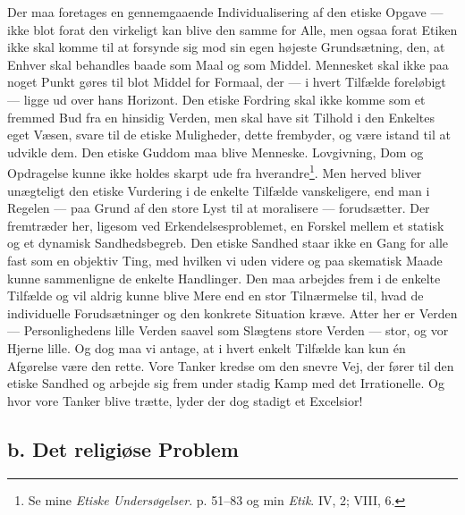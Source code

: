 \documentclass[12pt,a4paper]{book}
\newcommand{\apage}[1]{\marginnote{\footnotesize\textit{[#1]}}}
\begin{document}
Der maa foretages en gennemgaaende Individualisering af den etiske Opgave --- ikke blot
forat den virkeligt kan blive den samme for Alle, men ogsaa forat Etiken ikke skal komme
til at forsynde sig mod sin egen højeste Grundsætning, den, at Enhver skal behandles baade
som Maal \apage{369} og som Middel. Mennesket skal ikke paa noget Punkt gøres til blot Middel for
Formaal, der --- i hvert Tilfælde foreløbigt --- ligge ud over hans Horizont. Den etiske
Fordring skal ikke komme som et fremmed Bud fra en hinsidig Verden, men skal have sit
Tilhold i den Enkeltes eget Væsen, svare til de etiske Muligheder, dette frembyder, og være
istand til at udvikle dem. Den etiske Guddom maa blive Menneske. Lovgivning, Dom og
Opdragelse kunne ikke holdes skarpt ude fra hverandre\footnote{Se mine \emph{Etiske
Undersøgelser}. p. 51--83 og min \emph{Etik}. IV, 2; VIII, 6.}. Men herved bliver
unægteligt den etiske Vurdering i de enkelte Tilfælde vanskeligere, end man i Regelen --- paa
Grund af den store Lyst til at moralisere --- forudsætter. Der fremtræder her, ligesom ved
Erkendelsesproblemet, en Forskel mellem et statisk og et dynamisk Sandhedsbegreb. Den etiske
Sandhed staar ikke en Gang for alle fast som en objektiv Ting, med hvilken vi uden videre
og paa skematisk Maade kunne sammenligne de enkelte Handlinger. Den maa arbejdes frem i de enkelte Tilfælde og vil aldrig kunne blive Mere end en stor Tilnærmelse til, hvad de
individuelle Forudsætninger og den konkrete Situation kræve. Atter her er Verden ---
Personlighedens lille Verden saavel som Slægtens store Verden --- stor, og vor Hjerne lille.
Og dog maa vi antage, at i hvert enkelt Tilfælde kan kun én Afgørelse være den rette. Vore
Tanker kredse om den snevre Vej, der fører til den etiske Sandhed og arbejde sig frem under
stadig Kamp med det Irrationelle. Og hvor vore Tanker blive trætte, lyder der dog stadigt
et Excelsior!

\subsection*{b. Det religiøse Problem}
\end{document}
